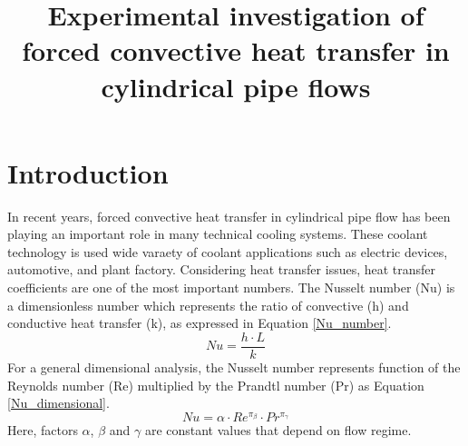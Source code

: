 \documentclass[conference]{IEEEtran}
\begin{document}
\title{Experimental investigation of forced convective heat transfer in cylindrical pipe flows\\
}

\author{
}

\maketitle

%
%

\section{Introduction}
In recent years, forced convective heat transfer in cylindrical pipe flow has been playing an important role in many technical cooling systems.
These coolant technology is used wide varaety of coolant applications such as electric devices, automotive, and plant factory.
Considering heat transfer issues, heat transfer coefficients are one of the most important numbers.
The Nusselt number (Nu) is a dimensionless number which represents the ratio of convective (h) and conductive heat transfer (k), as expressed in Equation \eqref{Nu_number}.
\begin{equation}
Nu=\frac{h\cdot L}{k}\label{Nu_number}
\end{equation}
For a general dimensional analysis, the Nusselt number represents function of the Reynolds number (Re) multiplied by the Prandtl number (Pr) as Equation \eqref{Nu_dimensional}.
\begin{equation}
Nu=\alpha \cdot Re^{\pi_{\beta}}\cdot Pr^{\pi_{\gamma}}\label{Nu_dimensional}
\end{equation}
Here, factors $\alpha$, $\beta$ and $\gamma$ are constant values that depend on flow regime.
\end{document}
